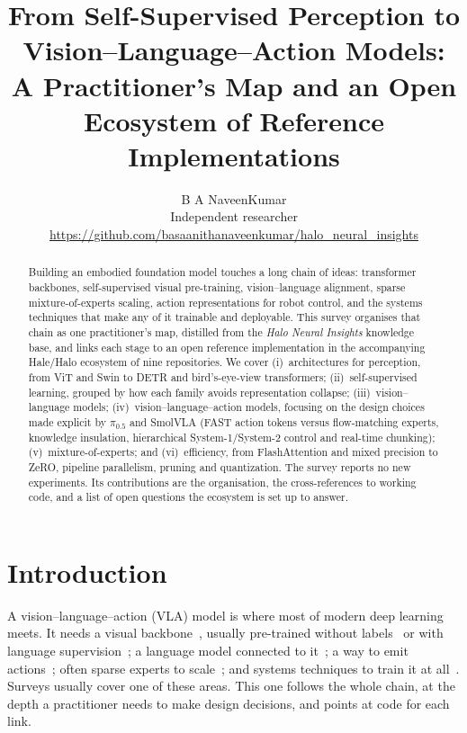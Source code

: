\documentclass[11pt]{article}
\title{\textbf{From Self-Supervised Perception to Vision--Language--Action Models:\\A Practitioner's Map and an Open Ecosystem of Reference Implementations}}
\author{B A NaveenKumar\\
\small Independent researcher\\
\small \url{https://github.com/basaanithanaveenkumar/halo_neural_insights}}
\date{}
\begin{document}
\maketitle

\begin{abstract}
Building an embodied foundation model touches a long chain of ideas: transformer
backbones, self-supervised visual pre-training, vision--language alignment, sparse
mixture-of-experts scaling, action representations for robot control, and the systems
techniques that make any of it trainable and deployable. This survey organises that chain
as one practitioner's map, distilled from the \emph{Halo Neural Insights} knowledge base, and
links each stage to an open reference implementation in the accompanying Hale/Halo
ecosystem of nine repositories. We cover (i)~architectures for perception, from ViT and Swin
to DETR and bird's-eye-view transformers; (ii)~self-supervised learning, grouped by how each
family avoids representation collapse; (iii)~vision--language models; (iv)~vision--language--action
models, focusing on the design choices made explicit by $\pi_{0.5}$ and SmolVLA (FAST action
tokens versus flow-matching experts, knowledge insulation, hierarchical System-1/System-2
control and real-time chunking); (v)~mixture-of-experts; and (vi)~efficiency, from
FlashAttention and mixed precision to ZeRO, pipeline parallelism, pruning and quantization.
The survey reports no new experiments. Its contributions are the organisation, the
cross-references to working code, and a list of open questions the ecosystem is set up to
answer.
\end{abstract}

\section{Introduction}

A vision--language--action (VLA) model is where most of modern deep learning meets. It
needs a visual backbone~\cite{dosovitskiy2021vit}, usually pre-trained without
labels~\cite{caron2021dino,oquab2023dinov2} or with language supervision~\cite{radford2021clip,zhai2023siglip};
a language model connected to it~\cite{liu2023llava}; a way to emit actions~\cite{brohan2023rt2,black2024pi0};
often sparse experts to scale~\cite{shazeer2017outrageously,dai2024deepseekmoe}; and systems
techniques to train it at all~\cite{dao2022flashattention,rajbhandari2020zero}. Surveys usually
cover one of these areas. This one follows the whole chain, at the depth a practitioner
needs to make design decisions, and points at code for each link.
\end{document}
